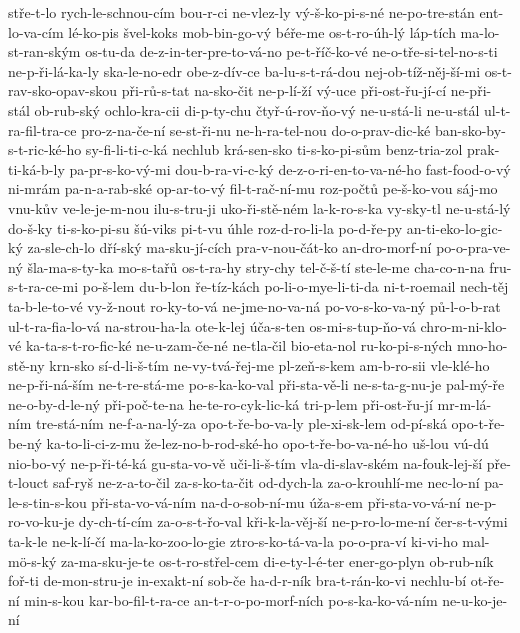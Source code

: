 {stře-t-lo
rych-le-schnou-cím
bou-r-ci
ne-vlez-ly
vý-š-ko-pi-s-né
ne-po-tre-stán
ent-lo-va-cím
lé-ko-pis
švel-koks
mob-bin-go-vý
béře-me
os-t-ro-úh-lý
láp-tích
ma-lo-st-ran-ským
os-tu-da
de-z-in-ter-pre-to-vá-no
pe-t-říč-ko-vé
ne-o-tře-si-tel-no-s-ti
ne-p-ři-lá-ka-ly
ska-le-no-edr
obe-z-dív-ce
ba-lu-s-t-rá-dou
nej-ob-tíž-něj-ší-mi
os-t-rav-sko-opav-skou
při-rů-s-tat
na-sko-čit
ne-p-lí-ží
vý-uce
při-ost-řu-jí-cí
ne-při-stál
ob-rub-ský
ochlo-kra-cii
di-p-ty-chu
čtyř-ú-rov-ňo-vý
ne-u-stá-li
ne-u-stál
ul-t-ra-fil-tra-ce
pro-z-na-če-ní
se-st-ři-nu
ne-h-ra-tel-nou
do-o-prav-dic-ké
ban-sko-by-s-t-ric-ké-ho
sy-fi-li-ti-c-ká
nechlub
krá-sen-sko
ti-s-ko-pi-sům
benz-tria-zol
prak-ti-ká-b-ly
pa-pr-s-ko-vý-mi
dou-b-ra-vi-c-ký
de-z-o-ri-en-to-va-né-ho
fast-food-o-vý
ni-mrám
pa-n-a-rab-ské
op-ar-to-vý
fil-t-rač-ní-mu
roz-počtů
pe-š-ko-vou
sáj-mo
vnu-kův
ve-le-je-m-nou
ilu-s-tru-ji
uko-ři-stě-ném
la-k-ro-s-ka
vy-sky-tl
ne-u-stá-lý
do-š-ky
ti-s-ko-pi-su
šú-viks
pi-t-vu
úhle
roz-d-ro-li-la
po-d-ře-py
an-ti-eko-lo-gic-ký
za-sle-ch-lo
dří-ský
ma-sku-jí-cích
pra-v-nou-čát-ko
an-dro-morf-ní
po-o-pra-ve-ný
šla-ma-s-ty-ka
mo-s-tařů
os-t-ra-hy
stry-chy
tel-č-š-tí
ste-le-me
cha-co-n-na
fru-s-t-ra-ce-mi
po-š-lem
du-b-lon
ře-tíz-kách
po-li-o-mye-li-ti-da
ni-t-roemail
nech-těj
ta-b-le-to-vé
vy-ž-nout
ro-ky-to-vá
ne-jme-no-va-ná
po-vo-s-ko-va-ný
pů-l-o-b-rat
ul-t-ra-fia-lo-vá
na-strou-ha-la
ote-k-lej
úča-s-ten
os-mi-s-tup-ňo-vá
chro-m-ni-klo-vé
ka-ta-s-t-ro-fic-ké
ne-u-zam-če-né
ne-tla-čil
bio-eta-nol
ru-ko-pi-s-ných
mno-ho-stě-ny
krn-sko
sí-d-li-š-tím
ne-vy-tvá-řej-me
pl-zeň-s-kem
am-b-ro-sii
vle-klé-ho
ne-p-ři-ná-ším
ne-t-re-stá-me
po-s-ka-ko-val
při-sta-vě-li
ne-s-ta-g-nu-je
pal-mý-ře
ne-o-by-d-le-ný
při-poč-te-na
he-te-ro-cyk-lic-ká
tri-p-lem
při-ost-řu-jí
mr-m-lá-ním
tre-stá-ním
ne-f-a-na-lý-za
opo-t-ře-bo-va-ly
ple-xi-sk-lem
od-pí-ská
opo-t-ře-be-ný
ka-to-li-ci-z-mu
že-lez-no-b-rod-ské-ho
opo-t-ře-bo-va-né-ho
uš-lou
vú-dú
nio-bo-vý
ne-p-ři-té-ká
gu-sta-vo-vě
uči-li-š-tím
vla-di-slav-ském
na-fouk-lej-ší
pře-t-louct
saf-ryš
ne-z-a-to-čil
za-s-ko-ta-čit
od-dych-la
za-o-krouhlí-me
nec-lo-ní
pa-le-s-tin-s-kou
při-sta-vo-vá-ním
na-d-o-sob-ní-mu
úža-s-em
při-sta-vo-vá-ní
ne-p-ro-vo-ku-je
dy-ch-tí-cím
za-o-s-t-řo-val
kři-k-la-věj-ší
ne-p-ro-lo-me-ní
čer-s-t-vými
ta-k-le
ne-k-lí-čí
ma-la-ko-zoo-lo-gie
ztro-s-ko-tá-va-la
po-o-pra-ví
ki-vi-ho
mal-mö-s-ký
za-ma-sku-je-te
os-t-ro-střel-cem
di-e-ty-l-é-ter
ener-go-plyn
ob-rub-ník
foř-ti
de-mon-stru-je
in-exakt-ní
sob-če
ha-d-r-ník
bra-t-rán-ko-vi
nechlu-bí
ot-ře-ní
min-s-kou
kar-bo-fil-t-ra-ce
an-t-r-o-po-morf-ních
po-s-ka-ko-vá-ním
ne-u-ko-je-ní
}
